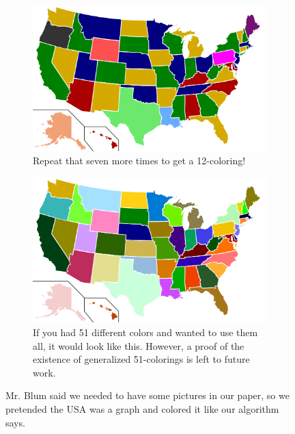 \documentclass{article}
\begin{document}
\begin{figure}
	\begin{subfigure}[b]{0.45\textwidth}
	\includegraphics[width=\textwidth]{12color.pdf}
	\caption{Repeat that seven more times to get a 12-coloring! \\ \vspace{3.3em}}
	\end{subfigure}
	\quad
	\begin{subfigure}[b]{0.45\textwidth}
	\includegraphics[width=\textwidth]{50color.pdf}
	\caption{If you had 51 different colors and wanted to use them all, it would look like this. However, a proof of the existence of generalized 51-colorings is left to future work.}
	\end{subfigure}
	\caption{Mr. Blum said we needed to have some pictures in our paper, so we pretended the USA was a graph and colored it like our algorithm says.}
	\label{fig:usa}
\end{figure}
\end{document}
